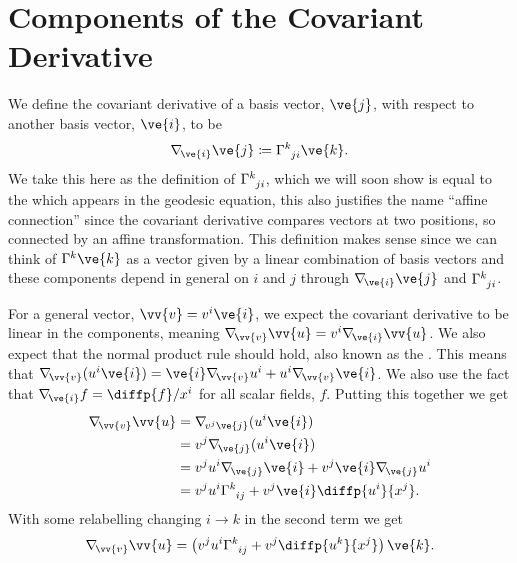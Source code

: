 \documentclass[fleqn]{NotesClass}
\newcommand*{\christoffel}[3]{\tensor{\Gamma}{^{#1}_{{#2}{#3}}}}
\newcommand*{\covariantDerivative}[1]{\nabla_{\!#1}}
\begin{document}
    \section{Components of the Covariant Derivative}
    We define the covariant derivative of a basis vector, \(\ve{j}\), with respect to another basis vector, \(\ve{i}\), to be
    \begin{equation}\label{eqn:affine connection again}
        \covariantDerivative{\ve{i}} \ve{j} \coloneqq \christoffel{k}{j}{i} \ve{k}.
    \end{equation}
    We take this here as the definition of \(\christoffel{k}{j}{i}\), which we will soon show is equal to the  which appears in the geodesic equation, this also justifies the name \enquote{affine connection} since the covariant derivative compares vectors at two positions, so connected by an affine transformation.
    This definition makes sense since we can think of \(\Gamma^k\ve{k}\) as a vector given by a linear combination of basis vectors and these components depend in general on \(i\) and \(j\) through \(\covariantDerivative{\ve{i}}\ve{j}\) and \(\christoffel{k}{j}{i}\).
    
    For a general vector, \(\vv{v} = v^i\ve{i}\), we expect the covariant derivative to be linear in the components, meaning \(\covariantDerivative{\vv{v}}\vv{u} = v^i\covariantDerivative{\ve{i}}\vv{u}\).
    We also expect that the normal product rule should hold, also known as the .
    This means that \(\covariantDerivative{\vv{v}} (u^i\ve{i}) = \ve{i}\covariantDerivative{\vv{v}} u^i + u^i\covariantDerivative{\vv{v}} \ve{i}\).
    We also use the fact that \(\covariantDerivative{\ve{i}} f = \diffp{f}/{x^i}\) for all scalar fields, \(f\).
    Putting this together we get
    \begin{align}
        \covariantDerivative{\vv{v}}\vv{u} &= \covariantDerivative{v^j\ve{j}} (u^i\ve{i})\\
        &= v^j\covariantDerivative{\ve{j}} (u^i\ve{i})\\
        &= v^ju^i \covariantDerivative{\ve{j}} \ve{i} + v^j\ve{i} \covariantDerivative{\ve{j}} u^i\\
        &= v^ju^i \christoffel{k}{i}{j} + v^j\ve{i}\diffp{u^i}{x^j}.
    \end{align}
    With some relabelling changing \(i \to k\) in the second term we get
    \begin{equation}
        \covariantDerivative{\vv{v}}\vv{u} = \left( v^ju^i\christoffel{k}{i}{j} + v^j\diffp{u^k}{x^j} \right) \ve{k}.
    \end{equation}
    
\end{document}
